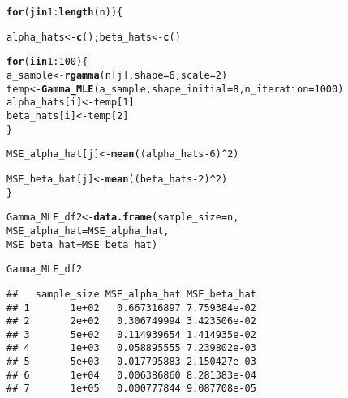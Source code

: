 \documentclass[11pt, a4paper]{article}\usepackage[]{graphicx}\usepackage[]{xcolor}
\makeatletter
\newcommand{\hlnum}[1]{\textcolor[rgb]{0.686,0.059,0.569}{#1}}%
\newcommand{\hlopt}[1]{\textcolor[rgb]{0,0,0}{#1}}%
\newcommand{\hldef}[1]{\textcolor[rgb]{0.345,0.345,0.345}{#1}}%
\newcommand{\hlkwa}[1]{\textcolor[rgb]{0.161,0.373,0.58}{\textbf{#1}}}%
\newcommand{\hlkwb}[1]{\textcolor[rgb]{0.69,0.353,0.396}{#1}}%
\newcommand{\hlkwc}[1]{\textcolor[rgb]{0.333,0.667,0.333}{#1}}%
\newcommand{\hlkwd}[1]{\textcolor[rgb]{0.737,0.353,0.396}{\textbf{#1}}}%
\newenvironment{kframe}{%
 \def\at@end@of@kframe{}%
 \ifinner\ifhmode%
  \def\at@end@of@kframe{\end{minipage}}%
  \begin{minipage}{\columnwidth}%
 \fi\fi%
 \def\FrameCommand##1{\hskip\@totalleftmargin \hskip-\fboxsep
 \colorbox{shadecolor}{##1}\hskip-\fboxsep
     \hskip-\linewidth \hskip-\@totalleftmargin \hskip\columnwidth}%
 \MakeFramed {\advance\hsize-\width
   \@totalleftmargin\z@ \linewidth\hsize
   \@setminipage}}%
 {\par\unskip\endMakeFramed%
 \at@end@of@kframe}
\newenvironment{knitrout}{}{} %
\makeatother
\begin{document}
\begin{knitrout}
\color{fgcolor}\begin{kframe}
\begin{alltt}
\hlkwa{for}\hldef{(j} \hlkwa{in} \hlnum{1}\hlopt{:}\hlkwd{length}\hldef{(n))\{}

  \hldef{alpha_hats} \hlkwb{<-} \hlkwd{c}\hldef{(); beta_hats} \hlkwb{<-} \hlkwd{c}\hldef{()}

  \hlkwa{for} \hldef{(i} \hlkwa{in} \hlnum{1}\hlopt{:}\hlnum{100}\hldef{) \{}
    \hldef{a_sample} \hlkwb{<-} \hlkwd{rgamma}\hldef{(n[j],} \hlkwc{shape} \hldef{=} \hlnum{6}\hldef{,} \hlkwc{scale} \hldef{=} \hlnum{2}\hldef{)}
    \hldef{temp} \hlkwb{<-} \hlkwd{Gamma_MLE}\hldef{(a_sample,} \hlkwc{shape_initial} \hldef{=} \hlnum{8}\hldef{,} \hlkwc{n_iteration} \hldef{=} \hlnum{1000}\hldef{)}
    \hldef{alpha_hats[i]} \hlkwb{<-} \hldef{temp[}\hlnum{1}\hldef{]}
    \hldef{beta_hats[i]} \hlkwb{<-} \hldef{temp[}\hlnum{2}\hldef{]}
  \hldef{\}}

  \hldef{MSE_alpha_hat[j]} \hlkwb{<-} \hlkwd{mean}\hldef{( (alpha_hats} \hlopt{-} \hlnum{6}\hldef{)}\hlopt{^}\hlnum{2} \hldef{)}

  \hldef{MSE_beta_hat[j]} \hlkwb{<-} \hlkwd{mean}\hldef{( (beta_hats} \hlopt{-} \hlnum{2}\hldef{)}\hlopt{^}\hlnum{2} \hldef{)}
\hldef{\}}
\end{alltt}
\end{kframe}
\end{knitrout}

\begin{knitrout}
\color{fgcolor}\begin{kframe}
\begin{alltt}
\hldef{Gamma_MLE_df2} \hlkwb{<-} \hlkwd{data.frame}\hldef{(}\hlkwc{sample_size} \hldef{= n,}
                            \hlkwc{MSE_alpha_hat} \hldef{= MSE_alpha_hat,}
                            \hlkwc{MSE_beta_hat} \hldef{= MSE_beta_hat)}
\end{alltt}
\end{kframe}
\end{knitrout}

\begin{knitrout}
\color{fgcolor}\begin{kframe}
\begin{alltt}
\hldef{Gamma_MLE_df2}
\end{alltt}
\begin{verbatim}
##   sample_size MSE_alpha_hat MSE_beta_hat
## 1       1e+02   0.667316897 7.759384e-02
## 2       2e+02   0.306749994 3.423506e-02
## 3       5e+02   0.114939654 1.414935e-02
## 4       1e+03   0.058895555 7.239802e-03
## 5       5e+03   0.017795883 2.150427e-03
## 6       1e+04   0.006386860 8.281383e-04
## 7       1e+05   0.000777844 9.087708e-05
\end{verbatim}
\end{kframe}
\end{knitrout}
\end{document}
